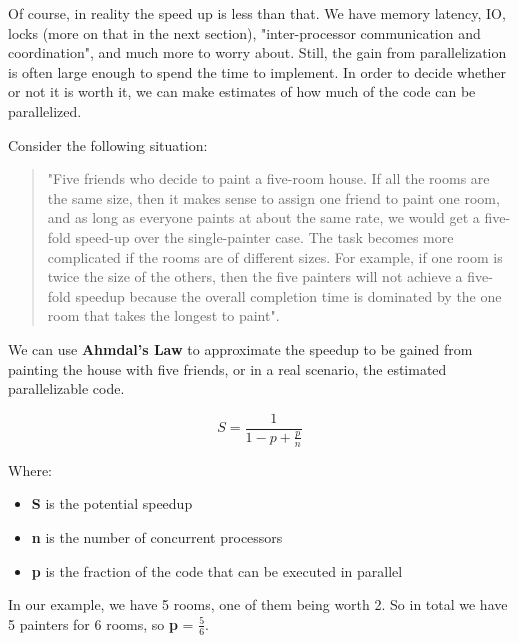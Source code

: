 \documentclass[letterpaper, 12pt]{article}
\begin{document}
\par\vspace{\baselineskip}
Of course, in reality the speed up is less than that. We have memory latency, IO, locks 
(more on that in the next section), "inter-processor communication and coordination"\citep[p. 13]{artofmulti}, 
and much more to worry about. Still, the gain from parallelization is often large enough to spend 
the time to implement. In order to decide whether or not it is worth it, we can make estimates of 
how much of the code can be parallelized.

\par\vspace{\baselineskip}

\newpage
Consider the following situation: 
\begin{quotation}
	"Five friends who decide to paint a five-room house. If all the rooms are the same size, 
	then it makes sense to assign one friend to paint one room, and as long as everyone paints at 
	about the same rate, we would get a five-fold speed-up over the single-painter case. 
	The task becomes more complicated if the rooms are of different sizes. For example, if one 
	room is twice the size of the others, then the five painters will not achieve a five-fold 
	speedup because the overall completion time is dominated by the one room that takes the 
	longest to paint"\citep[p. 13]{artofmulti}.
\end{quotation}

We can use {\bfseries Ahmdal's Law} to approximate the speedup to be gained from painting the house with five friends, or in a real scenario, the estimated parallelizable code. 

\begin{equation}
	S = \frac{1}{1-p+\frac{p}{n}}
\end{equation}

Where:

\begin{itemize}
	\item {\bfseries S} is the potential speedup
	\item {\bfseries n} is the number of concurrent processors
	\item {\bfseries p} is the fraction of the code that can be executed in parallel
\end{itemize} 

In our example, we have 5 rooms, one of them being worth 2. So in total we have 5 painters for 6 rooms, so 
{\bfseries p} = \(\frac{5}{6}\). 
\end{document}
